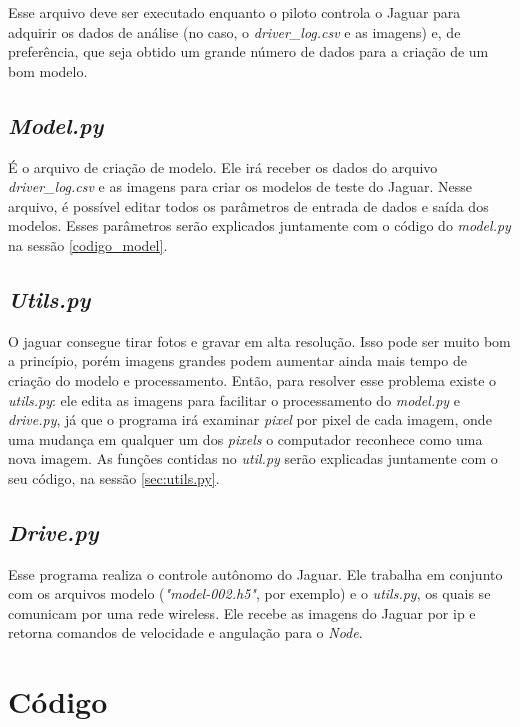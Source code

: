 Esse arquivo deve ser executado enquanto o piloto controla o Jaguar para adquirir os dados de análise (no caso, o \textit{driver\_log.csv} e as imagens) e, de preferência, que seja obtido um grande número de dados para a criação de um bom modelo. 

\subsection{\textit{Model.py}}

É o arquivo de criação de modelo. Ele irá receber os dados do arquivo \textit{driver\_log.csv} e as imagens para criar os modelos de teste do Jaguar. Nesse arquivo, é possível editar todos os parâmetros de entrada de dados e saída dos modelos. Esses parâmetros serão explicados juntamente com o código do \textit{model.py} na sessão \ref{codigo_model}. 

\subsection{\textit{Utils.py}}

 O jaguar consegue tirar fotos e gravar em alta resolução. Isso pode ser muito bom a princípio, porém imagens grandes podem aumentar ainda mais tempo de criação do modelo e processamento. Então, para resolver esse problema existe o \textit{utils.py}: ele edita as imagens para facilitar o processamento do \textit{model.py} e \textit{drive.py}, já que o programa irá examinar \textit{pixel} por pixel de cada imagem, onde uma mudança em qualquer um dos \textit{pixels} o computador reconhece como uma nova imagem. As funções contidas no \textit{util.py} serão explicadas juntamente com o seu código, na sessão \ref{sec:utils.py}. 

\subsection{\textit{Drive.py}}

Esse programa realiza o controle autônomo do Jaguar. Ele trabalha em conjunto com os arquivos modelo (\textit{"model-002.h5"}, por exemplo) e o \textit{utils.py}, os quais se comunicam por uma rede wireless. Ele recebe as imagens do Jaguar por ip e retorna comandos de velocidade e angulação para o \textit{Node}. 

\section{Código}
\label{codigo}

